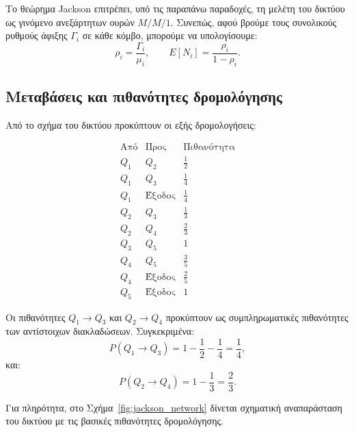 \documentclass{article}
\begin{document}
Το θεώρημα Jackson επιτρέπει, υπό τις παραπάνω παραδοχές, τη μελέτη του δικτύου ως γινόμενο ανεξάρτητων ουρών $M/M/1$. Συνεπώς, αφού βρούμε τους συνολικούς ρυθμούς άφιξης $\Gamma_i$ σε κάθε κόμβο, μπορούμε να υπολογίσουμε:
\[
    \rho_i = \frac{\Gamma_i}{\mu_i},
    \qquad
    E[N_i] = \frac{\rho_i}{1-\rho_i}.
\]

\subsection{Μεταβάσεις και πιθανότητες δρομολόγησης}

Από το σχήμα του δικτύου προκύπτουν οι εξής δρομολογήσεις:

\[
\begin{array}{c|c|c}
\text{Από} & \text{Προς} & \text{Πιθανότητα} \\
\hline
Q_1 & Q_2 & \frac{1}{2} \\
Q_1 & Q_3 & \frac{1}{4} \\
Q_1 & \text{Έξοδος} & \frac{1}{4} \\
Q_2 & Q_3 & \frac{1}{3} \\
Q_2 & Q_4 & \frac{2}{3} \\
Q_3 & Q_5 & 1 \\
Q_4 & Q_5 & \frac{3}{5} \\
Q_4 & \text{Έξοδος} & \frac{2}{5} \\
Q_5 & \text{Έξοδος} & 1
\end{array}
\]

Οι πιθανότητες $Q_1 \to Q_3$ και $Q_2 \to Q_4$ προκύπτουν ως συμπληρωματικές πιθανότητες των αντίστοιχων διακλαδώσεων. Συγκεκριμένα:
\[
    P(Q_1 \to Q_3) = 1-\frac{1}{2}-\frac{1}{4} = \frac{1}{4},
\]
και:
\[
    P(Q_2 \to Q_4) = 1-\frac{1}{3} = \frac{2}{3}.
\]

Για πληρότητα, στο Σχήμα~\ref{fig:jackson_network} δίνεται σχηματική αναπαράσταση του δικτύου με τις βασικές πιθανότητες δρομολόγησης.
\end{document}
